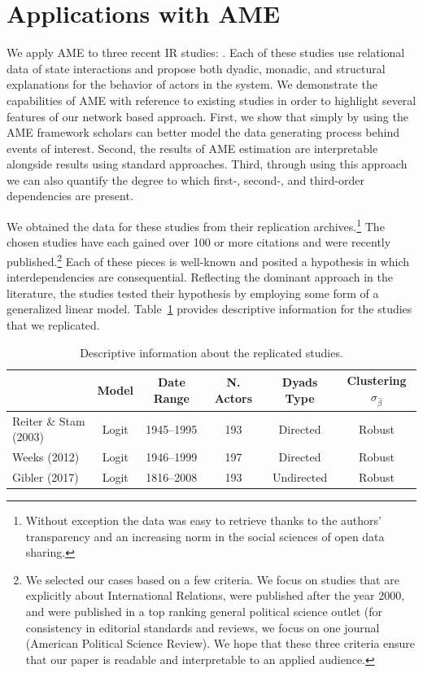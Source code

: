 \section{\textbf{Applications with AME}}

We apply AME to three recent IR studies: \citet{reiter:stam:2003, weeks:2012, gibler:2017}. Each of these studies use relational data of state interactions and propose both dyadic, monadic, and structural explanations for the behavior of actors in the system. We demonstrate the capabilities of AME with reference to existing studies in order to highlight several features of our network based approach. First, we show that simply by using the AME framework scholars can better model the data generating process behind events of interest. Second, the results of AME estimation are interpretable alongside results using standard approaches. Third, through using this approach we can also quantify the degree to which first-, second-, and third-order dependencies are present.

We obtained the data for these studies from their replication archives.\footnote{Without exception the data was easy to retrieve thanks to the authors' transparency and an increasing norm in the social sciences of open data sharing.} The chosen studies have each gained over 100 or more citations and were recently published.\footnote{We selected our cases based on a few criteria. We focus on studies that are explicitly about International Relations, were published after the year 2000, and were published in a top ranking general political science outlet (for consistency in editorial standards and reviews, we focus on one journal (American Political Science Review). We hope that these three criteria ensure that our paper is readable and interpretable to an applied audience.} Each of these pieces is well-known and posited a hypothesis in which interdependencies are consequential. Reflecting the dominant approach in the literature, the studies tested their hypothesis by employing some form of a generalized linear model. Table~\ref{tab:modelDesign} provides descriptive information for the studies that we replicated.

\begin{table}
\caption{Descriptive information about the replicated studies. }
	\begin{tabular}{lccccc}
		& Model &  Date Range & N. Actors  & Dyads Type & Clustering $\sigma_{\hat{\beta}}$ \\ \toprule
		Reiter \& Stam (2003) & Logit &1945--1995 &  193 & Directed & Robust \\
		Weeks (2012) & Logit & 1946--1999 & 197 & Directed & Robust \\
		Gibler (2017) & Logit & 1816--2008 & 193 & Undirected & Robust \\ \bottomrule
	\end{tabular}
	\label{tab:modelDesign}
\end{table}

